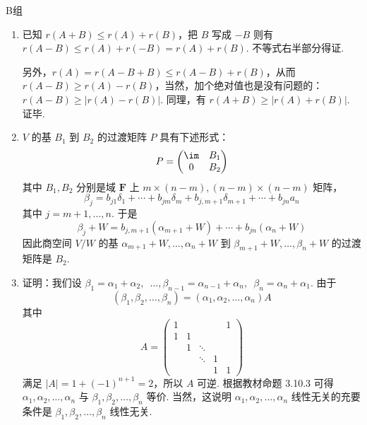 \centerline{\heiti B组}
\begin{enumerate}
    \item 已知 $r(A+B) \leqslant r(A)+r(B)$，把 $B$ 写成 $-B$ 则有 $r(A-B) \leqslant r(A)+r(-B)=r(A)+r(B)$. 不等式右半部分得证.

          另外，$r(A)=r(A-B+B) \leqslant r(A-B)+r(B)$，从而 $r(A-B) \geqslant r(A)-r(B)$，当然，加个绝对值也是没有问题的：$r(A-B) \geqslant \lvert r(A)-r(B) \rvert$. 同理，有 $r(A+B) \geqslant \lvert r(A)+r(B) \rvert$. 证毕.

    \item $V$ 的基 $B_1$ 到 $B_2$ 的过渡矩阵 $P$ 具有下述形式：
          \[P=\begin{pmatrix}\im & B_1 \\ 0 & B_2\end{pmatrix}\]
          其中 $B_1,B_2$ 分别是域 $\mathbf{F}$ 上 $m\times (n-m),(n-m)\times (n-m)$ 矩阵，
          \[\beta_j=b_{j1}\delta_1+\cdots+b_{jm}\delta_m+b_{j,m+1}\delta_{m+1}+\cdots+b_{jn}a_n\]
          其中 $j=m+1,\ldots,n$. 于是
          \[\beta_j+W=b_{j,m+1}(\alpha_{m+1}+W)+\cdots+b_{jn}(\alpha_n+W)\]
          因此商空间 $V/W$ 的基 $\alpha_{m+1}+W,\ldots,\alpha_n+W$ 到 $\beta_{m+1}+W,\ldots,\beta_n+W$ 的过渡矩阵是 $B_2$.

    \item 证明：我们设 $ \beta_1 = \alpha_1 + \alpha_2,\enspace \ldots, \beta_{n - 1} = \alpha_{n - 1} + \alpha_n,\enspace \beta_n = \alpha_n + \alpha_1 $. 由于
          \[ (\beta_1, \beta_2, \ldots, \beta_n) = (\alpha_1, \alpha_2, \ldots, \alpha_n) A \]
          其中
          \[ A = \begin{pmatrix}
                  1 &   &        &   & 1 \\
                  1 & 1 &        &   &   \\
                    & 1 & \ddots &   &   \\
                    &   & \ddots & 1 &   \\
                    &   &        & 1 & 1
              \end{pmatrix} \]
          满足 $ |A| = 1 + (-1)^{n + 1} = 2 $，所以 $ A $ 可逆. 根据教材命题 3.10.3 可得 $ \alpha_1, \alpha_2, \ldots, \alpha_n $ 与 $ \beta_1, \beta_2, \ldots, \beta_n $ 等价. 当然，这说明 $ \alpha_1, \alpha_2, \ldots, \alpha_n $ 线性无关的充要条件是 $ \beta_1, \beta_2, \ldots, \beta_n $ 线性无关.


\end{enumerate}

